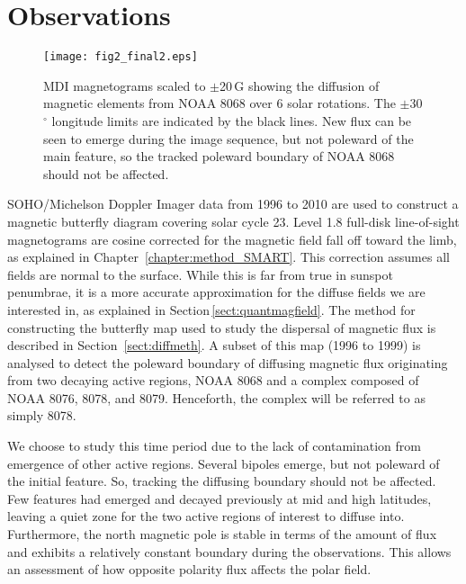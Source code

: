 \section{Observations}\label{sect:obs}

 \begin{figure}[!t]    %
   \centerline{\texttt{[image: fig2\_final2.eps]}
              }
              \caption[NOAA 8068 over 6 solar rotations.]{MDI magnetograms scaled to $\pm$20\,G showing the diffusion of magnetic elements from NOAA 8068 over 6 solar rotations. The $\pm$30$^\circ$ longitude limits are indicated by the black lines. New flux can be seen to emerge during the image sequence, but not poleward of the main feature, so the tracked poleward boundary of NOAA 8068 should not be affected.}
   \label{fig:obsmosaic}
   \end{figure}


\gls{SOHO}/Michelson Doppler Imager \citep[MDI;][]{Scherrer:1995} data from 1996 to 2010 are used to construct a magnetic butterfly diagram covering solar cycle 23. Level 1.8 full-disk line-of-sight magnetograms are cosine corrected for the magnetic field fall off toward the limb, as explained in Chapter~\ref{chapter:method_SMART}. This correction assumes all fields are normal to the surface. While this is far from true in sunspot penumbrae, it is a more accurate approximation for the diffuse fields we are interested in, as explained in Section\,\ref{sect:quantmagfield}. 
The method for constructing the butterfly map used to study the dispersal of magnetic flux is described in Section~\ref{sect:diffmeth}. A subset of this map (1996 to 1999) is analysed to detect the poleward boundary of diffusing magnetic flux originating from two decaying active regions, \gls{NOAA} 8068 and a complex composed of \gls{NOAA} 8076, 8078, and 8079. Henceforth, the complex will be referred to as simply 8078. 

We choose to study this time period due to the lack of contamination from emergence of other active regions. Several bipoles emerge, but not poleward of the initial feature. So, tracking the diffusing boundary should not be affected. Few features had emerged and decayed previously at mid and high latitudes, leaving a quiet zone for the two active regions of interest to diffuse into. Furthermore, the north magnetic pole is stable in terms of the amount of flux and exhibits a relatively constant boundary during the observations. This allows an assessment of how opposite polarity flux affects the polar field. 

